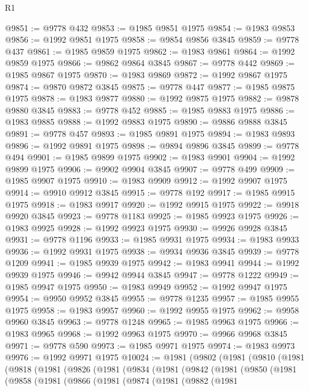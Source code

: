 \begin{lexlean}{R1}
\begin{coremodule}
@9851 := @9778 @432
@9853 := @1985 @9851 @1975
@9854 := @1983 @9853
@9856 := @1992 @9851 @1975
@9858 := @9854 @9856 @3845
@9859 := @9778 @437
@9861 := @1985 @9859 @1975
@9862 := @1983 @9861
@9864 := @1992 @9859 @1975
@9866 := @9862 @9864 @3845
@9867 := @9778 @442
@9869 := @1985 @9867 @1975
@9870 := @1983 @9869
@9872 := @1992 @9867 @1975
@9874 := @9870 @9872 @3845
@9875 := @9778 @447
@9877 := @1985 @9875 @1975
@9878 := @1983 @9877
@9880 := @1992 @9875 @1975
@9882 := @9878 @9880 @3845
@9883 := @9778 @452
@9885 := @1985 @9883 @1975
@9886 := @1983 @9885
@9888 := @1992 @9883 @1975
@9890 := @9886 @9888 @3845
@9891 := @9778 @457
@9893 := @1985 @9891 @1975
@9894 := @1983 @9893
@9896 := @1992 @9891 @1975
@9898 := @9894 @9896 @3845
@9899 := @9778 @494
@9901 := @1985 @9899 @1975
@9902 := @1983 @9901
@9904 := @1992 @9899 @1975
@9906 := @9902 @9904 @3845
@9907 := @9778 @499
@9909 := @1985 @9907 @1975
@9910 := @1983 @9909
@9912 := @1992 @9907 @1975
@9914 := @9910 @9912 @3845
@9915 := @9778 @192
@9917 := @1985 @9915 @1975
@9918 := @1983 @9917
@9920 := @1992 @9915 @1975
@9922 := @9918 @9920 @3845
@9923 := @9778 @1183
@9925 := @1985 @9923 @1975
@9926 := @1983 @9925
@9928 := @1992 @9923 @1975
@9930 := @9926 @9928 @3845
@9931 := @9778 @1196
@9933 := @1985 @9931 @1975
@9934 := @1983 @9933
@9936 := @1992 @9931 @1975
@9938 := @9934 @9936 @3845
@9939 := @9778 @1209
@9941 := @1985 @9939 @1975
@9942 := @1983 @9941
@9944 := @1992 @9939 @1975
@9946 := @9942 @9944 @3845
@9947 := @9778 @1222
@9949 := @1985 @9947 @1975
@9950 := @1983 @9949
@9952 := @1992 @9947 @1975
@9954 := @9950 @9952 @3845
@9955 := @9778 @1235
@9957 := @1985 @9955 @1975
@9958 := @1983 @9957
@9960 := @1992 @9955 @1975
@9962 := @9958 @9960 @3845
@9963 := @9778 @1248
@9965 := @1985 @9963 @1975
@9966 := @1983 @9965
@9968 := @1992 @9963 @1975
@9970 := @9966 @9968 @3845
@9971 := @9778 @590
@9973 := @1985 @9971 @1975
@9974 := @1983 @9973
@9976 := @1992 @9971 @1975
@10024 := @1981
    (@9802
      (@1981
        (@9810
          (@1981
            (@9818
              (@1981
                (@9826
                  (@1981
                    (@9834
                      (@1981
                        (@9842
                          (@1981
                            (@9850
                              (@1981
                                (@9858
                                  (@1981
                                    (@9866
                                      (@1981
                                        (@9874
                                          (@1981
                                            (@9882
                                              (@1981

\end{coremodule}
\end{lexlean}
